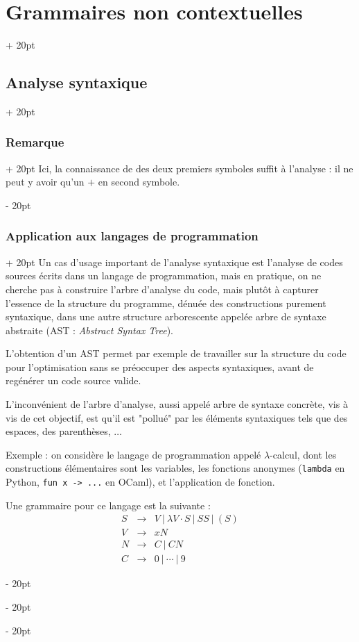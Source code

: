 \documentclass[a4paper, 12pt, twoside]{article}
\newcommand{\ind}[1][20pt]{\advance\leftskip + #1}
\newcommand{\deind}[1][20pt]{\advance\leftskip - #1}
\newenvironment{indt}[2][20pt]{#2 \par \ind[#1]}{\par \deind} %
\begin{document}
\begin{indt}{\section{Grammaires non contextuelles}}
\begin{indt}{\subsection{Analyse syntaxique}}
\begin{indt}{\subsubsection{Remarque}}
                Ici, la connaissance de des deux premiers symboles suffit à l'analyse : il ne peut y avoir qu'un $+$ en second symbole.
            \end{indt}

            \vspace{12pt}
            
            \begin{indt}{\subsubsection{Application aux langages de programmation}}
                Un cas d'usage important de l'analyse syntaxique est l'analyse de codes sources écrits dans un langage de programmation, mais en pratique, on ne cherche pas à construire l'arbre  d'analyse du code, mais plutôt à capturer l'essence de la structure du programme, dénuée des constructions purement syntaxique, dans une autre structure arborescente appelée arbre de syntaxe abstraite (AST : \textit{Abstract Syntax Tree}).

                L'obtention d'un AST permet par exemple de travailler sur la structure du code pour l'optimisation sans se préoccuper des aspects syntaxiques, avant de regénérer un code source valide.

                L'inconvénient de l'arbre d'analyse, aussi appelé arbre de syntaxe concrète, vis à vis de cet objectif, est qu'il est "pollué" par les éléments syntaxiques tels que des espaces, des parenthèses, $\ldots$

                \vspace{12pt}
                
                Exemple : on considère le langage de programmation appelé $\lambda$-calcul, dont les constructions élémentaires sont les variables, les fonctions anonymes (\texttt{lambda} en Python, \texttt{fun x -> ...} en OCaml), et l'application de fonction.

                Une grammaire pour ce langage est la suivante :
                \[
                    \begin{array}{rcl}
                        S & \rightarrow & V \ |\ \lambda V \cdot S\ |\ S S \ |\ (S)
                        \\
                        V & \rightarrow & xN
                        \\
                        N & \rightarrow & C \ |\ CN
                        \\
                        C & \rightarrow & 0\ |\ \cdots \ |\ 9
                    \end{array}
                \]


\end{indt}
\end{indt}
\end{indt}
\end{document}
